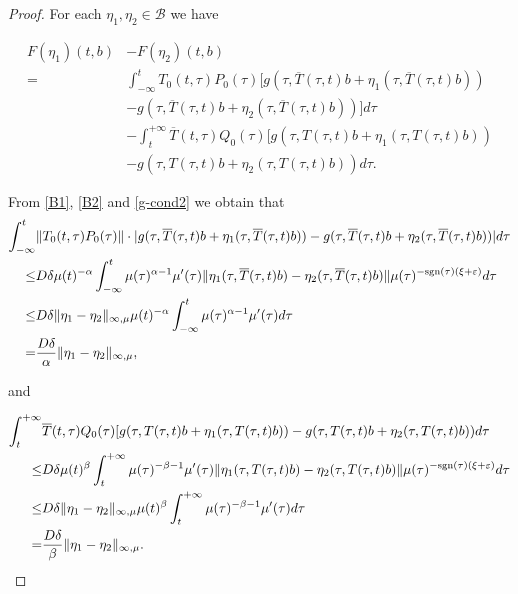 \documentclass[9pt]{amsart}
\numberwithin{equation}{section}
\numberwithin{lemma}{section}
\begin{document}
\begin{proof}
For each $\eta_1, \eta_2\in\mathcal{B}$ we have

    \begin{equation*}
        \begin{split}
        F(\eta_1)(t,b) &- F(\eta_2)(t,b)\\
        =& \int_{-\infty}^{t}T_0(t,\tau)P_0(\tau)[g(\tau,\overline{T}(\tau,t)b+\eta_1(\tau,\overline{T}(\tau,t)b))\\
        &- g(\tau,\overline{T}(\tau,t)b+\eta_2(\tau,\overline{T}(\tau,t)b))]d\tau\\
        &- \int_{t}^{+\infty}\overline{T}(t,\tau)Q_0(\tau)[g(\tau,T(\tau,t)b+\eta_1(\tau,T(\tau,t)b))\\
        &-g(\tau,T(\tau,t)b+\eta_2(\tau,T(\tau,t)b))d\tau.
    \end{split}
    \end{equation*}

    From \eqref{B1}, \eqref{B2} and \eqref{g-cond2} we obtain that
\begin{equation*}
    \begin{split}
        \int_{-\infty}^{t}&\|T_0(t,\tau)P_0(\tau)\|\cdot|g(\tau,\overline{T}(\tau,t)b+\eta_1(\tau,\overline{T}(\tau,t)b))- g(\tau,\overline{T}(\tau,t)b+\eta_2(\tau,\overline{T}(\tau,t)b))|d\tau\\
        \leq & D\delta\mu(t)^{-\alpha}\int_{-\infty}^{t}\mu(\tau)^{\alpha-1}\mu'(\tau)\|\eta_1(\tau,\overline{T}(\tau,t)b) - \eta_2(\tau,\overline{T}(\tau,t)b)\|\mu(\tau)^{-\textnormal{sgn}(\tau)(\xi+\varepsilon)}d\tau\\
        \leq & D\delta\|\eta_1-\eta_2\|_{\infty,\mu}\mu(t)^{-\alpha}\int_{-\infty}^{t}\mu(\tau)^{\alpha-1}\mu'(\tau)d\tau\\
        =& \frac{D\delta}{\alpha}\|\eta_1-\eta_2\|_{\infty,\mu},
    \end{split}
\end{equation*}

and

\begin{equation*}
    \begin{split}
        \int_{t}^{+\infty}&\overline{T}(t,\tau)Q_0(\tau)[g(\tau,T(\tau,t)b+\eta_1(\tau,T(\tau,t)b))
        -g(\tau,T(\tau,t)b+\eta_2(\tau,T(\tau,t)b))d\tau\\
        \leq & D\delta\mu(t)^{\beta}\int_{t}^{+\infty}\mu(\tau)^{-\beta-1}\mu'(\tau)\|\eta_1(\tau,T(\tau,t)b) - \eta_2(\tau,T(\tau,t)b)\|\mu(\tau)^{-\textnormal{sgn}(\tau)(\xi+\varepsilon)}d\tau\\
        \leq & D\delta\|\eta_1-\eta_2\|_{\infty,\mu}\mu(t)^{\beta}\int_{t}^{+\infty}\mu(\tau)^{-\beta-1}\mu'(\tau)d\tau\\
        =& \frac{D\delta}{\beta}\|\eta_1-\eta_2\|_{\infty,\mu}.
    \end{split}
\end{equation*}


\end{proof}
\end{document}

